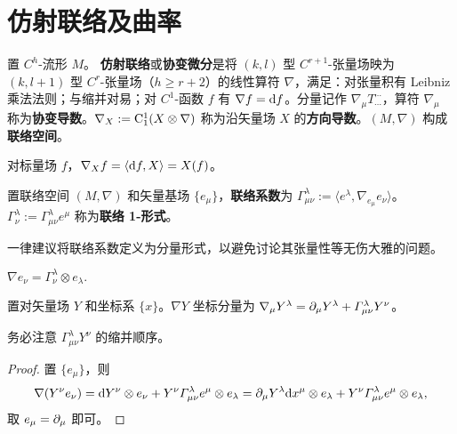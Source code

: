 \chapter{仿射联络及曲率}\label{appx:curvature}
\begin{definition}
    置 $C^{h}$-流形 $M$。
    \textbf{仿射联络}或\textbf{协变微分}是将 $(k,l)$ 型 $C^{r+1}$-张量场映为 $(k,l+1)$ 型 $C^{r}$-张量场（$h\geqslant r+2$）的线性算符 $\nabla$，满足：对张量积有 Leibniz 乘法法则；与缩并对易；对 $C^1$-函数 $f$ 有 $\nabla f=\dd f$。分量记作 $\nabla_\mu T^{\cdots}_{\cdots}$，算符 $\nabla_\mu$ 称为\textbf{协变导数}。$\nabla_X:=\mathrm{C}^1_1(X\otimes\nabla)$ 称为沿矢量场 $X$ 的\textbf{方向导数}。$(M,\nabla)$ 构成\textbf{联络空间}。
\end{definition}

\begin{eg}
    对标量场 $f$，$\nabla_X f=\langle\dd f,X\rangle=X(f)$。
\end{eg}


\begin{definition}
    置联络空间 $(M,\nabla)$ 和矢量基场 $\{e_\mu\}$，\textbf{联络系数}为 $\Gamma^\lambda_{\mu\nu}:=\langle e^\lambda,\nabla_{e_\mu} e_\nu\rangle$。
    $\Gamma^\lambda_\nu:=\Gamma^\lambda_{\mu\nu} e^\mu$ 称为\textbf{联络 1-形式}。
\end{definition}

\begin{remark}
    一律建议将联络系数定义为分量形式，以避免讨论其张量性等无伤大雅的问题。
\end{remark}

\begin{theorem}
    $\nabla e_\nu=\Gamma^\lambda_\nu\otimes e_\lambda.$
\end{theorem}

\begin{theorem}
    置对矢量场 $Y$ 和坐标系 $\{x\}$。$\nabla Y$ 坐标分量为 $\nabla_\mu Y^\lambda=\partial_\mu Y^\lambda+\Gamma^\lambda_{\mu\nu}Y^\nu$。
\end{theorem}
\begin{remark}
    务必注意 $\Gamma^\lambda_{\mu\nu}Y^\nu$ 的缩并顺序。
\end{remark}
\begin{proof}置 $\{e_\mu\}$，则
    \[\nabla(Y^\nu e_\nu)=\dd Y^\nu\otimes e_\nu+Y^\nu \Gamma^\lambda_{\mu\nu} e^\mu\otimes e_\lambda=\partial_\mu Y^\lambda\dd x^\mu\otimes e_\lambda+Y^\nu \Gamma^\lambda_{\mu\nu} e^\mu\otimes e_\lambda,\]
    取 $e_\mu=\partial_\mu$ 即可。
\end{proof}


